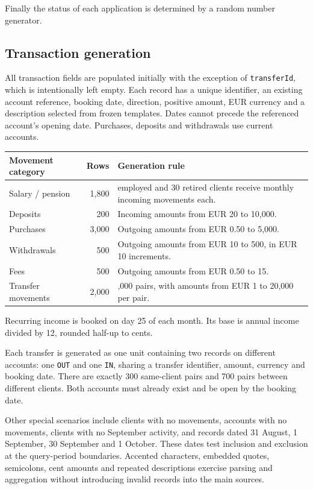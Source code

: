 \documentclass[11pt,a4paper]{article}
\begin{document}
Finally the status of each application is determined by a random number generator.

\subsection{Transaction generation}

All transaction fields are populated initially with the exception of
\texttt{transferId}, which is intentionally left empty. Each record has a unique
identifier, an existing account reference, booking date, direction, positive
amount, EUR currency and a description selected from frozen templates.
Dates cannot precede the referenced account's opening date. Purchases,
deposits and withdrawals use current accounts.

\begingroup
\renewcommand{\arraystretch}{1.2}
\begin{tabularx}{\textwidth}{@{}p{3cm} r >{\raggedright\arraybackslash}X@{}}
\toprule
Movement category & Rows & Generation rule\\
\midrule
Salary / pension & 1,800 & 150 employed and 30 retired clients receive monthly incoming movements each.\\
Deposits & 200 & Incoming amounts from EUR 20 to 10,000.\\
Purchases & 3,000 & Outgoing amounts from EUR 0.50 to 5,000.\\
Withdrawals & 500 & Outgoing amounts from EUR 10 to 500, in EUR 10 increments.\\
Fees & 500 & Outgoing amounts from EUR 0.50 to 15.\\
Transfer movements & 2,000 & 1,000 pairs, with amounts from EUR 1 to 20,000 per pair.\\
\bottomrule
\end{tabularx}
\endgroup

Recurring income is booked on day 25 of each month. Its base is annual income
divided by 12, rounded half-up to cents.

Each transfer is generated as one unit containing two records on different
accounts: one \texttt{OUT} and one \texttt{IN}, sharing a transfer identifier,
amount, currency and booking date. There are exactly 300 same-client pairs
and 700 pairs between different clients. Both accounts must already exist
and be open by the booking date.

Other special scenarios include clients with no movements, accounts with no
movements, clients with no September activity, and records dated 31 August,
1 September, 30 September and 1 October. These dates test inclusion and
exclusion at the query-period boundaries. Accented characters, embedded
quotes, semicolons, cent amounts and repeated descriptions exercise parsing
and aggregation without introducing invalid records into the main sources.
\end{document}
